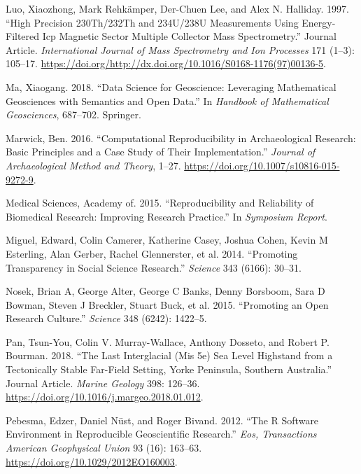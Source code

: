 \documentclass[]{elsarticle} %
\begin{document}
\leavevmode\hypertarget{ref-RN2951}{}%
Luo, Xiaozhong, Mark Rehkämper, Der-Chuen Lee, and Alex N. Halliday. 1997. ``High Precision 230Th/232Th and 234U/238U Measurements Using Energy-Filtered Icp Magnetic Sector Multiple Collector Mass Spectrometry.'' Journal Article. \emph{International Journal of Mass Spectrometry and Ion Processes} 171 (1--3): 105--17. \url{https://doi.org/http://dx.doi.org/10.1016/S0168-1176(97)00136-5}.

\leavevmode\hypertarget{ref-ma2018data}{}%
Ma, Xiaogang. 2018. ``Data Science for Geoscience: Leveraging Mathematical Geosciences with Semantics and Open Data.'' In \emph{Handbook of Mathematical Geosciences}, 687--702. Springer.

\leavevmode\hypertarget{ref-Marwick2016repro}{}%
Marwick, Ben. 2016. ``Computational Reproducibility in Archaeological Research: Basic Principles and a Case Study of Their Implementation.'' \emph{Journal of Archaeological Method and Theory}, 1--27. \url{https://doi.org/10.1007/s10816-015-9272-9}.

\leavevmode\hypertarget{ref-academy2015reproducibility}{}%
Medical Sciences, Academy of. 2015. ``Reproducibility and Reliability of Biomedical Research: Improving Research Practice.'' In \emph{Symposium Report}.

\leavevmode\hypertarget{ref-miguel2014promoting}{}%
Miguel, Edward, Colin Camerer, Katherine Casey, Joshua Cohen, Kevin M Esterling, Alan Gerber, Rachel Glennerster, et al. 2014. ``Promoting Transparency in Social Science Research.'' \emph{Science} 343 (6166): 30--31.

\leavevmode\hypertarget{ref-nosek2015promoting}{}%
Nosek, Brian A, George Alter, George C Banks, Denny Borsboom, Sara D Bowman, Steven J Breckler, Stuart Buck, et al. 2015. ``Promoting an Open Research Culture.'' \emph{Science} 348 (6242): 1422--5.

\leavevmode\hypertarget{ref-RN5108}{}%
Pan, Tsun-You, Colin V. Murray-Wallace, Anthony Dosseto, and Robert P. Bourman. 2018. ``The Last Interglacial (Mis 5e) Sea Level Highstand from a Tectonically Stable Far-Field Setting, Yorke Peninsula, Southern Australia.'' Journal Article. \emph{Marine Geology} 398: 126--36. \url{https://doi.org/10.1016/j.margeo.2018.01.012}.

\leavevmode\hypertarget{ref-Pebesma_Nust_Bivand_2012}{}%
Pebesma, Edzer, Daniel Nüst, and Roger Bivand. 2012. ``The R Software Environment in Reproducible Geoscientific Research.'' \emph{Eos, Transactions American Geophysical Union} 93 (16): 163--63. \url{https://doi.org/10.1029/2012EO160003}.
\end{document}
